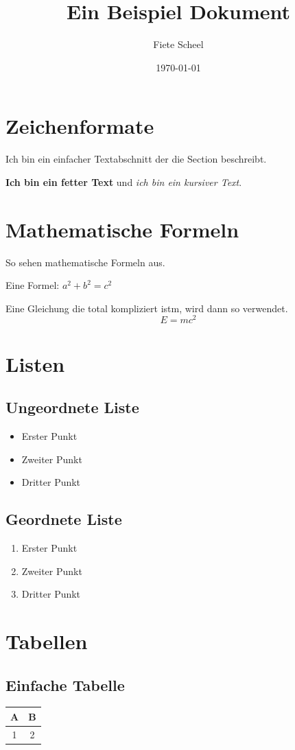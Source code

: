 \documentclass{article}
\title{Ein Beispiel Dokument} %
\author{Fiete Scheel} %
\date{\today} %
\begin{document}
\maketitle

\tableofcontents

\section{Zeichenformate}
Ich bin ein einfacher Textabschnitt der die Section beschreibt.

\textbf{Ich bin ein fetter Text} und \textit{ich bin ein kursiver Text}.

\section{Mathematische Formeln}
So sehen mathematische Formeln aus.

Eine Formel: \(a^2 + b^2 = c^2\)

Eine Gleichung die total kompliziert istm, wird dann so verwendet.
\[
  E = mc^2
\]

\section{Listen}

\subsection{Ungeordnete Liste}
\begin{itemize}
  \item Erster Punkt
  \item Zweiter Punkt
  \item Dritter Punkt
\end{itemize}

\subsection{Geordnete Liste}
\begin{enumerate}
  \item Erster Punkt
  \item Zweiter Punkt
  \item Dritter Punkt
\end{enumerate}

\section{Tabellen}
\subsection{Einfache Tabelle}
\begin{tabular}{|c|c|}
  \hline
  A & B \\
  \hline
  1 & 2 \\
\hline
\end{tabular}
\end{document}
